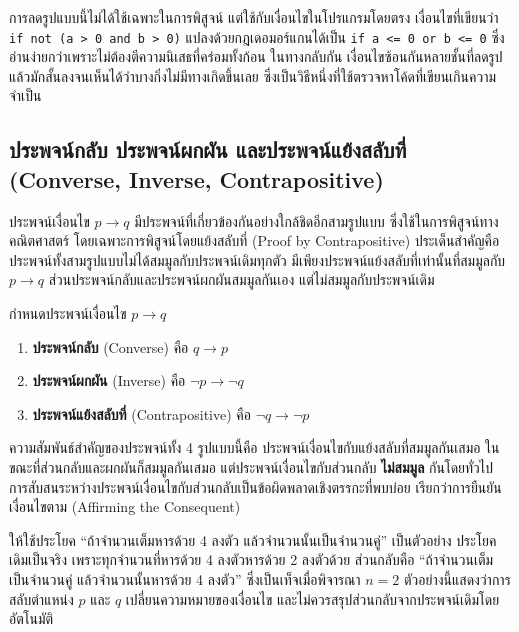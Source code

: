 การลดรูปแบบนี้ไม่ได้ใช้เฉพาะในการพิสูจน์ แต่ใช้กับเงื่อนไขในโปรแกรมโดยตรง เงื่อนไขที่เขียนว่า \texttt{if not (a > 0 and b > 0)} แปลงด้วยกฎเดอมอร์แกนได้เป็น \texttt{if a <= 0 or b <= 0} ซึ่งอ่านง่ายกว่าเพราะไม่ต้องตีความนิเสธที่คร่อมทั้งก้อน ในทางกลับกัน เงื่อนไขซ้อนกันหลายชั้นที่ลดรูปแล้วมักสั้นลงจนเห็นได้ว่าบางกิ่งไม่มีทางเกิดขึ้นเลย ซึ่งเป็นวิธีหนึ่งที่ใช้ตรวจหาโค้ดที่เขียนเกินความจำเป็น

\subsection{ประพจน์กลับ ประพจน์ผกผัน และประพจน์แย้งสลับที่ (Converse, Inverse, Contrapositive)}

ประพจน์เงื่อนไข $p \rightarrow q$ มีประพจน์ที่เกี่ยวข้องกันอย่างใกล้ชิดอีกสามรูปแบบ ซึ่งใช้ในการพิสูจน์ทางคณิตศาสตร์ โดยเฉพาะการพิสูจน์โดยแย้งสลับที่ (Proof by Contrapositive) ประเด็นสำคัญคือประพจน์ทั้งสามรูปแบบไม่ได้สมมูลกับประพจน์เดิมทุกตัว มีเพียงประพจน์แย้งสลับที่เท่านั้นที่สมมูลกับ $p \rightarrow q$ ส่วนประพจน์กลับและประพจน์ผกผันสมมูลกันเอง แต่ไม่สมมูลกับประพจน์เดิม~\parencite{epp2019discrete}

\begin{definition}
กำหนดประพจน์เงื่อนไข $p \rightarrow q$
\begin{enumerate}
    \item \textbf{ประพจน์กลับ} (Converse) คือ $q \rightarrow p$
    \item \textbf{ประพจน์ผกผัน} (Inverse) คือ $\neg p \rightarrow \neg q$
    \item \textbf{ประพจน์แย้งสลับที่} (Contrapositive) คือ $\neg q \rightarrow \neg p$
\end{enumerate}
\end{definition}

ความสัมพันธ์สำคัญของประพจน์ทั้ง 4 รูปแบบนี้คือ ประพจน์เงื่อนไขกับแย้งสลับที่สมมูลกันเสมอ ในขณะที่ส่วนกลับและผกผันก็สมมูลกันเสมอ แต่ประพจน์เงื่อนไขกับส่วนกลับ \textbf{ไม่สมมูล} กันโดยทั่วไป การสับสนระหว่างประพจน์เงื่อนไขกับส่วนกลับเป็นข้อผิดพลาดเชิงตรรกะที่พบบ่อย เรียกว่าการยืนยันเงื่อนไขตาม (Affirming the Consequent)

ให้ใช้ประโยค ``ถ้าจำนวนเต็มหารด้วย 4 ลงตัว แล้วจำนวนนั้นเป็นจำนวนคู่'' เป็นตัวอย่าง ประโยคเดิมเป็นจริง เพราะทุกจำนวนที่หารด้วย 4 ลงตัวหารด้วย 2 ลงตัวด้วย ส่วนกลับคือ ``ถ้าจำนวนเต็มเป็นจำนวนคู่ แล้วจำนวนนั้นหารด้วย 4 ลงตัว'' ซึ่งเป็นเท็จเมื่อพิจารณา $n=2$ ตัวอย่างนี้แสดงว่าการสลับตำแหน่ง $p$ และ $q$ เปลี่ยนความหมายของเงื่อนไข และไม่ควรสรุปส่วนกลับจากประพจน์เดิมโดยอัตโนมัติ

